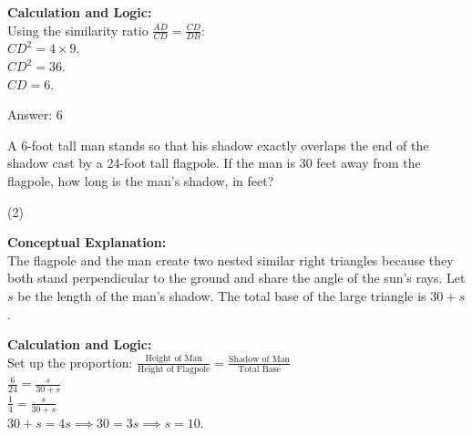 \documentclass[11pt,paper=a4,answers]{exam}
\begin{document}
\begin{questions}
\begin{solution}
\vspace{10pt}
\textbf{Calculation and Logic:} \\
Using the similarity ratio $\frac{AD}{CD} = \frac{CD}{DB}$: \\
$CD^2 = 4 \times 9$. \\
$CD^2 = 36$. \\
$CD = 6$.

\vspace{15pt}
Answer: \colorbox{yellow!100}{6}
\end{solution}



\question
A 6-foot tall man stands so that his shadow exactly overlaps the end of the shadow cast by a 24-foot tall flagpole. If the man is 30 feet away from the flagpole, how long is the man's shadow, in feet?
\begin{center}
\end{center}
\begin{tasks}(2)
\end{tasks}

\begin{solution}
\textbf{Conceptual Explanation:} \\
The flagpole and the man create two nested similar right triangles because they both stand perpendicular to the ground and share the angle of the sun's rays. Let $s$ be the length of the man's shadow. The total base of the large triangle is $30 + s$.

\vspace{10pt}
\textbf{Calculation and Logic:} \\
Set up the proportion: $\frac{\text{Height of Man}}{\text{Height of Flagpole}} = \frac{\text{Shadow of Man}}{\text{Total Base}}$ \\
$\frac{6}{24} = \frac{s}{30 + s}$ \\
$\frac{1}{4} = \frac{s}{30 + s}$ \\
$30 + s = 4s \implies 30 = 3s \implies s = 10$.


\end{solution}
\end{questions}
\end{document}
